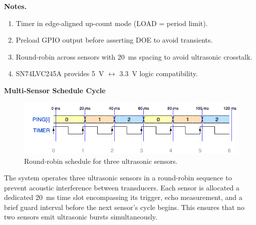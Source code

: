 \documentclass[12pt]{article}
\begin{document}
\noindent\textbf{Notes.}
\begin{enumerate}
  \item Timer in edge-aligned up-count mode (LOAD = period limit).
  \item Preload GPIO output before asserting DOE to avoid transients.
  \item Round-robin across sensors with \SI{20}{ms} spacing to avoid ultrasonic crosstalk.
  \item SN74LVC245A provides \SI{5}{V} $\leftrightarrow$ \SI{3.3}{V} logic compatibility.
\end{enumerate}

\newpage
\begin{center}
    {\LARGE \textbf{Multi-Sensor Schedule Cycle}}\\[0.5em]
\end{center}

\begin{figure}[h!]
    \centering
    \includegraphics[width=0.95\linewidth]{ping_round_robin_diagram.png}
    \caption{\small Round-robin schedule for three ultrasonic sensors.}
    \label{fig:ping_round_robin}
\end{figure}

\small
\noindent The system operates three ultrasonic sensors in a round-robin sequence to prevent acoustic interference between transducers. Each sensor is allocated a dedicated \SI{20}{ms} time slot encompassing its trigger, echo measurement, and a brief guard interval before the next sensor’s cycle begins. This ensures that no two sensors emit ultrasonic bursts simultaneously.
\end{document}
